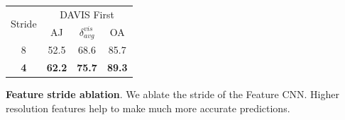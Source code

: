 \begin{tabular}{cccc}
\toprule
\multirow{2}{*}{Stride} & \multicolumn{3}{c}{DAVIS First} \\
\cmidrule(lr){2-4}
                        & AJ            & $\delta^{vis}_{avg}$ &  OA            \\
\midrule
 8                      & 52.5          & 68.6                 &  85.7          \\

\textbf{4}              & \textbf{62.2} & \textbf{75.7}        &  \textbf{89.3} \\
\bottomrule
\end{tabular}
\caption{
\textbf{Feature stride ablation}. We ablate the stride of the Feature CNN\@.
Higher resolution features help to make much more accurate predictions.}%
\label{tab:tab_model_stride_ablation}
\vspace{5.5em}
